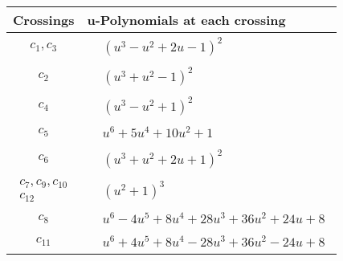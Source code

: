 \documentclass[1p]{elsarticle_modified}
\theoremstyle{definition}
\begin{document}
\begin{tabular}{m{50pt}|m{274pt}}
Crossings & \hspace{64pt}u-Polynomials at each crossing \\
\hline $$\begin{aligned}c_{1},c_{3}\end{aligned}$$&$\begin{aligned}
&(u^3- u^2+2 u-1)^2
\end{aligned}$\\
\hline $$\begin{aligned}c_{2}\end{aligned}$$&$\begin{aligned}
&(u^3+u^2-1)^2
\end{aligned}$\\
\hline $$\begin{aligned}c_{4}\end{aligned}$$&$\begin{aligned}
&(u^3- u^2+1)^2
\end{aligned}$\\
\hline $$\begin{aligned}c_{5}\end{aligned}$$&$\begin{aligned}
&u^6+5 u^4+10 u^2+1
\end{aligned}$\\
\hline $$\begin{aligned}c_{6}\end{aligned}$$&$\begin{aligned}
&(u^3+u^2+2 u+1)^2
\end{aligned}$\\
\hline $$\begin{aligned}c_{7},c_{9},c_{10}\\c_{12}\end{aligned}$$&$\begin{aligned}
&(u^2+1)^3
\end{aligned}$\\
\hline $$\begin{aligned}c_{8}\end{aligned}$$&$\begin{aligned}
&u^6-4 u^5+8 u^4+28 u^3+36 u^2+24 u+8
\end{aligned}$\\
\hline $$\begin{aligned}c_{11}\end{aligned}$$&$\begin{aligned}
&u^6+4 u^5+8 u^4-28 u^3+36 u^2-24 u+8
\end{aligned}$\\
\hline
\end{tabular}\\~\\
\end{document}
